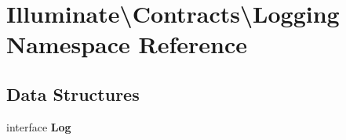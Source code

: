 \section{Illuminate\textbackslash{}Contracts\textbackslash{}Logging Namespace Reference}
\label{namespace_illuminate_1_1_contracts_1_1_logging}
\subsection*{Data Structures}
\begin{DoxyCompactItemize}
\item 
interface {\bf Log}
\end{DoxyCompactItemize}
